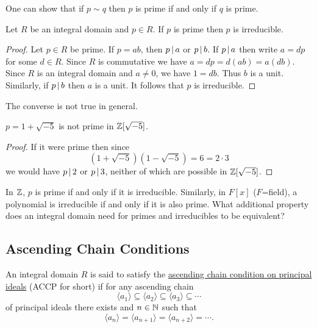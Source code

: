 \documentclass[11pt]{article}
\begin{document}
\begin{note}
    One can show that if $p\sim q$ then $p$ is prime if and only if $q$ is prime.
\end{note}

\begin{proposition}
    Let $R$ be an integral domain and $p\in R$. If $p$ is prime then $p$ is irreducible.
\end{proposition}

\begin{proof}
    Let $p\in R$ be prime. If $p=ab$, then $p\,|\, a$ or $p\,|\, b$. If $p\,|\, a$ then write $a=dp$ for some $d\in R$. Since $R$ is commutative we have $a=dp=d(ab)=a(db)$. Since $R$ is an integral domain and $a\neq0$, we have $1=db$. Thus $b$ is a unit. Similarly, if $p\,|\, b$ then $a$ is a unit. It follows that $p$ is irreducible.
    
\end{proof}

\begin{remark}
    The converse  is not true in general.
\end{remark}

\begin{example}
    $p=1+\sqrt{-5}$ is not prime in $\mathbb{Z}[\sqrt{-5}]$.
\end{example}

\begin{proof}
    If it were prime then since $$(1+\sqrt{-5})(1-\sqrt{-5})=6=2\cdot3$$ we would have $p\,|\, 2$ or $p\,|\, 3$, neither of which are possible in $\mathbb{Z}[\sqrt{-5}]$.
    
\end{proof}

\begin{question}
    In $\mathbb{Z}$, $p$ is prime if and only if it is irreducible. Similarly, in $F[x]$ ($F$=field), a polynomial is irreducible if and only if it is also prime. What additional property does an integral domain need for primes and irreducibles to be equivalent?
\end{question}

\subsection{Ascending Chain Conditions}

\begin{definition}
    An integral domain $R$ is said to satisfy the \ul{ascending chain condition on principal ideals} (ACCP for short) if for any ascending chain
    \[\langle a_1\rangle\subseteq\langle a_2\rangle\subseteq\langle a_3\rangle\subseteq\cdots\]
    of principal ideals there exists and $n\in\mathbb{N}$ such that
    \[\langle a_n\rangle=\langle a_{n+1}\rangle=\langle a_{n+2}\rangle=\cdots.\]
\end{definition}
\end{document}
